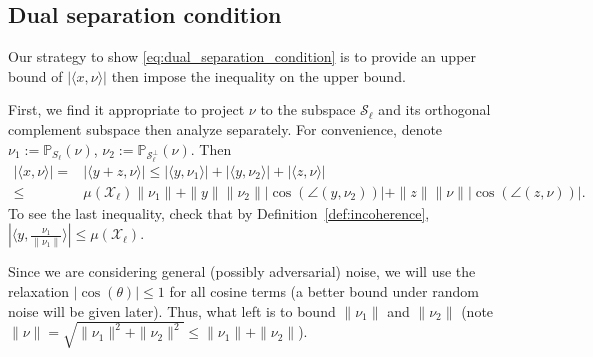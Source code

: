 \documentclass[twoside,11pt]{article}
\numberwithin{equation}{section}
\begin{document}



\subsection{Dual separation condition}\label{sec:dual_separation}

Our strategy to show \eqref{eq:dual_separation_condition} is to provide an upper bound of $|\langle x, \nu \rangle|$ then impose the inequality on the upper bound.

First, we find it appropriate to project $\nu$ to the subspace $\mathcal{S}_{\ell}$ and its orthogonal complement subspace then analyze separately. For convenience, denote $\nu_1 := \mathbb{P}_{S_\ell}(\nu)$, $\nu_2 := \mathbb{P}_{\mathcal{S}_{\ell}^\perp}(\nu)$. Then
\begin{equation}\label{eq:showing_dual_sep_cond}
\begin{aligned}
    |\langle x, \nu \rangle| =& |\langle y+z, \nu\rangle|\leq |\langle y, \nu_1\rangle|+|\langle y,\nu_2\rangle|+|\langle z, \nu\rangle|\\
    \leq& \mu(\mathcal{X}_{\ell}) \|\nu_1\| + \|y\|\|\nu_2\||\cos(\angle (y,\nu_2))|
     + \|z\|\|\nu\||\cos(\angle (z,\nu))|.
\end{aligned}
\end{equation}
To see the last inequality, check that by Definition~\ref{def:incoherence}, $|\langle y,\frac{\nu_1}{\|\nu_1\|}\rangle| \leq\mu(\mathcal{X}_{\ell})$.

Since we are considering general (possibly adversarial) noise, we will use the relaxation $|\cos(\theta)|\leq 1$ for all cosine terms (a better bound under random noise will be given later). Thus, what left is to bound $\|\nu_1\|$ and $\|\nu_2\|$ (note $\|\nu\|=\sqrt{\|\nu_1\|^2+\|\nu_2\|^2} \leq \|\nu_1\|+\|\nu_2\|$).
\end{document}

